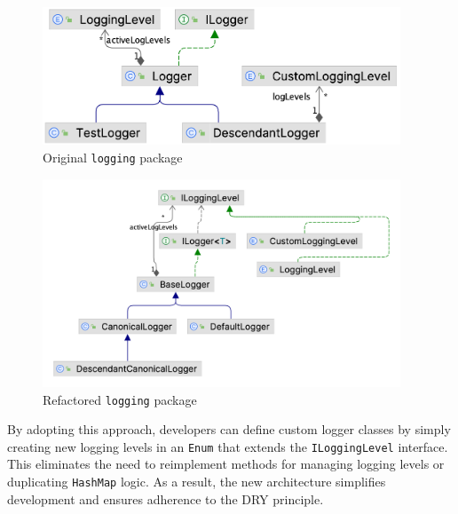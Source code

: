 \begin{minipage}{0.4\linewidth}
	\begin{figure}[H]
		\begin{center}
			\includegraphics[width=0.95\textwidth]{figures/logging_package/original.png}
			\caption{Original \texttt{logging} package}
			\label{fig:original-logging}
		\end{center}
	\end{figure}
\end{minipage}
\begin{minipage}{0.6\linewidth}
	\begin{figure}[H]
		\begin{center}
			\includegraphics[width=0.95\textwidth]{figures/logging_package/refactored.png}
			\caption{Refactored \texttt{logging} package}
			\label{fig:refactored-logging}
		\end{center}
	\end{figure}
\end{minipage}

\noindent By adopting this approach, developers can define custom logger classes by simply creating new logging levels in an \texttt{Enum} that extends the \texttt{ILoggingLevel} interface. This eliminates the need to reimplement methods for managing logging levels or duplicating \texttt{HashMap} logic. As a result, the new architecture simplifies development and ensures adherence to the DRY principle.


